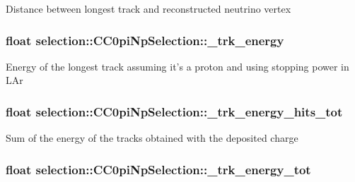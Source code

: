 Distance between longest track and reconstructed neutrino vertex \hypertarget{classselection_1_1CC0piNpSelection_a98e03f33f34b5df397a1d1144b1de4a1}{
\subsubsection[{\-\_\-trk\-\_\-energy}]{\setlength{\rightskip}{0pt plus 5cm}float selection\-::\-C\-C0pi\-Np\-Selection\-::\-\_\-trk\-\_\-energy\hspace{0.3cm}{\ttfamily [private]}}}\label{classselection_1_1CC0piNpSelection_a98e03f33f34b5df397a1d1144b1de4a1}
Energy of the longest track assuming it's a proton and using stopping power in L\-Ar \hypertarget{classselection_1_1CC0piNpSelection_a82a48c6128c34252642d237b98f1b66a}{
\subsubsection[{\-\_\-trk\-\_\-energy\-\_\-hits\-\_\-tot}]{\setlength{\rightskip}{0pt plus 5cm}float selection\-::\-C\-C0pi\-Np\-Selection\-::\-\_\-trk\-\_\-energy\-\_\-hits\-\_\-tot\hspace{0.3cm}{\ttfamily [private]}}}\label{classselection_1_1CC0piNpSelection_a82a48c6128c34252642d237b98f1b66a}
Sum of the energy of the tracks obtained with the deposited charge \hypertarget{classselection_1_1CC0piNpSelection_a8a0da0081e2f182880249debba6551e3}{
\subsubsection[{\-\_\-trk\-\_\-energy\-\_\-tot}]{\setlength{\rightskip}{0pt plus 5cm}float selection\-::\-C\-C0pi\-Np\-Selection\-::\-\_\-trk\-\_\-energy\-\_\-tot\hspace{0.3cm}{\ttfamily [private]}}}\label{classselection_1_1CC0piNpSelection_a8a0da0081e2f182880249debba6551e3}
